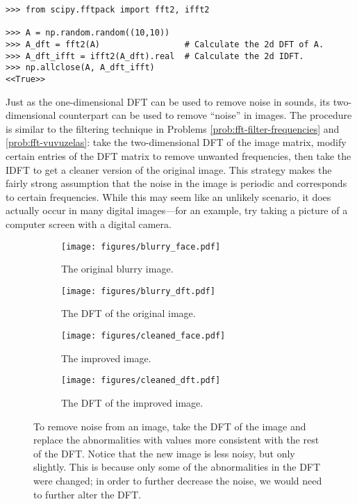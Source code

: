\begin{lstlisting}
>>> from scipy.fftpack import fft2, ifft2

>>> A = np.random.random((10,10))
>>> A_dft = fft2(A)                 # Calculate the 2d DFT of A.
>>> A_dft_ifft = ifft2(A_dft).real  # Calculate the 2d IDFT.
>>> np.allclose(A, A_dft_ifft)
<<True>>
\end{lstlisting}

Just as the one-dimensional DFT can be used to remove noise in sounds, its two-dimensional counterpart can be used to remove ``noise'' in images.
The procedure is similar to the filtering technique in Problems \ref{prob:fft-filter-frequencies} and \ref{prob:fft-vuvuzelas}: take the two-dimensional DFT of the image matrix, modify certain entries of the DFT matrix to remove unwanted frequencies, then take the IDFT to get a cleaner version of the original image.
This strategy makes the fairly strong assumption that the noise in the image is periodic and corresponds to certain frequencies.
While this may seem like an unlikely scenario, it does actually occur in many digital images---for an example, try taking a picture of a computer screen with a digital camera.

\begin{figure}
\captionsetup[subfigure]{justification=centering}
\centering
\begin{subfigure}{.4\textwidth}
    \centering
    \texttt{[image: figures/blurry\_face.pdf]}
    \caption{The original blurry image.}
    \label{fig:blurry_face}
\end{subfigure}
\begin{subfigure}{.4\textwidth}
    \centering
    \texttt{[image: figures/blurry\_dft.pdf]}
    \caption{The DFT of the original image.}
    \label{fig:blurry_fft}
\end{subfigure}
\begin{subfigure}{.4\textwidth}
    \centering
    \texttt{[image: figures/cleaned\_face.pdf]}
    \caption{The improved image.}
    \label{fig:improved_face}
\end{subfigure}
\begin{subfigure}{.4\textwidth}
    \centering
    \texttt{[image: figures/cleaned\_dft.pdf]}
    \caption{The DFT of the improved image.}
    \label{fig:covered_fft}
\end{subfigure}
\caption{To remove noise from an image, take the DFT of the image and replace the abnormalities with values more consistent with the rest of the DFT.
Notice that the new image is less noisy, but only slightly.
This is because only some of the abnormalities in the DFT were changed; in order to further decrease the noise, we would need to further alter the DFT.}
\label{fig:image_fft}
\end{figure}

